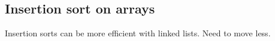 
\subsection{Insertion sort on arrays}

Insertion sorts can be more efficient with linked lists. Need to move less.

